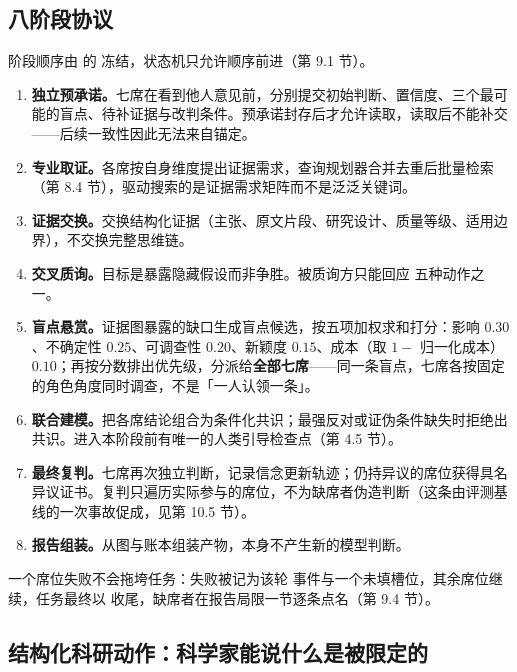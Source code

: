 \subsection{八阶段协议}

阶段顺序由  的  冻结，状态机只允许顺序前进（第 9.1 节）。

\begin{enumerate}[leftmargin=1.6em, itemsep=3pt]
\item \textbf{独立预承诺。}七席在看到他人意见前，分别提交初始判断、置信度、三个最可能的盲点、待补证据与改判条件。预承诺封存后才允许读取，读取后不能补交——后续一致性因此无法来自锚定。
\item \textbf{专业取证。}各席按自身维度提出证据需求，查询规划器合并去重后批量检索（第 8.4 节），驱动搜索的是证据需求矩阵而不是泛泛关键词。
\item \textbf{证据交换。}交换结构化证据（主张、原文片段、研究设计、质量等级、适用边界），不交换完整思维链。
\item \textbf{交叉质询。}目标是暴露隐藏假设而非争胜。被质询方只能回应  五种动作之一。
\item \textbf{盲点悬赏。}证据图暴露的缺口生成盲点候选，按五项加权求和打分：影响 $0.30$、不确定性 $0.25$、可调查性 $0.20$、新颖度 $0.15$、成本（取 $1-$ 归一化成本）$0.10$；再按分数排出优先级，分派给\textbf{全部七席}——同一条盲点，七席各按固定的角色角度同时调查，不是「一人认领一条」。
\item \textbf{联合建模。}把各席结论组合为条件化共识；最强反对或证伪条件缺失时拒绝出共识。进入本阶段前有唯一的人类引导检查点（第 4.5 节）。
\item \textbf{最终复判。}七席再次独立判断，记录信念更新轨迹；仍持异议的席位获得具名异议证书。复判只遍历实际参与的席位，不为缺席者伪造判断（这条由评测基线的一次事故促成，见第 10.5 节）。
\item \textbf{报告组装。}从图与账本组装产物，本身不产生新的模型判断。
\end{enumerate}

一个席位失败不会拖垮任务：失败被记为该轮  事件与一个未填槽位，其余席位继续，任务最终以  收尾，缺席者在报告局限一节逐条点名（第 9.4 节）。

\subsection{结构化科研动作：科学家能说什么是被限定的}

